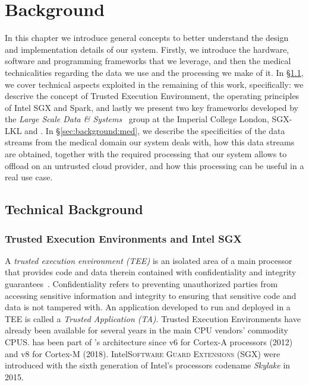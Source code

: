 \chapter{Background} \label{chap:background}

In this chapter we introduce general concepts to better understand the design and implementation details of our system.
Firstly, we introduce the hardware, software and programming frameworks that we leverage, and then the medical technicalities regarding the data we use and the processing we make of it.
In \S\ref{sec:background:tech}, we cover technical aspects exploited in the remaining of this work, specifically: we descrive the concept of Trusted Execution Environment, the operating principles of Intel SGX and Spark, and lastly we present two key frameworks developed by the \textit{Large Scale Data \& Systems}~\cite{lsds} group at the Imperial College London, \textsc{SGX-LKL} and \sgxspark.
In \S\ref{sec:background:med}, we describe the specificities of the data streams from the medical domain our system deals with, how this data streams are obtained, together with the required processing that our system allows to offload on an untrusted cloud provider, and how this processing can be useful in a real use case.

\section{Technical Background} \label{sec:background:tech}

\subsection{Trusted Execution Environments and Intel SGX}
A \emph{trusted execution environment (TEE)} is an isolated area of a main processor that provides code and data therein contained with confidentiality and integrity guarantees~\cite{tee-globalplatform}. 
Confidentiality refers to preventing unauthorized parties from accessing sensitive information and integrity to ensuring that sensitive code and data is not tampered with.
An application developed to run and deployed in a TEE is called a \emph{Trusted Application (TA)}.
Trusted Execution Environments have already been available for several years in the main CPU vendors' commodity CPUS.
\arm \tz has been part of \arm's architecture since v6 for Cortex-A processors (2012) and v8 for Cortex-M (2018).
Intel\textregistered\xspace \textsc{Software Guard Extensions (SGX)} were introduced with the sixth generation of Intel's processors codename \textit{Skylake} in 2015.

